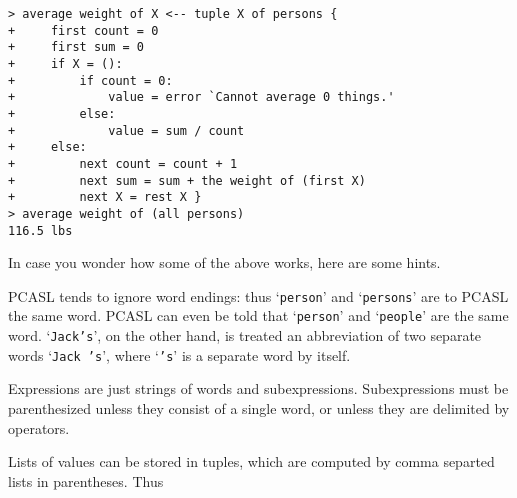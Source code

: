 \documentclass[12pt]{article}
\newenvironment{indpar}[1][0.3in]%
	{\begin{list}{}%
		     {\setlength{\itemsep}{0in}%
		      \setlength{\topsep}{0in}%
		      \setlength{\parsep}{1ex}%
		      \setlength{\labelwidth}{#1}%
		      \setlength{\leftmargin}{#1}%
		      \addtolength{\leftmargin}{\labelsep}}%
	 \item}%
	{\end{list}}
\begin{document}
\begin{indpar}
\verb|> average weight of X <-- tuple X of persons {| \\
\verb|+     first count = 0| \\
\verb|+     first sum = 0| \\
\verb|+     if X = ():| \\
\verb|+         if count = 0:| \\
\verb|+             value = error `Cannot average 0 things.'| \\
\verb|+         else:| \\
\verb|+             value = sum / count| \\
\verb|+     else:| \\
\verb|+         next count = count + 1| \\
\verb|+         next sum = sum + the weight of (first X)| \\
\verb|+         next X = rest X }| \\
\verb|> average weight of (all persons)| \\
\verb|116.5 lbs|
\end{indpar}

In case you wonder how some of the above works, here are some hints.

PCASL tends to ignore word endings: thus `{\tt person}' and
`{\tt persons}' are to PCASL the same word.
PCASL can even be told that `{\tt person}'
and `{\tt people}' are the same word.
`{\tt Jack's}', on the other hand, is treated an abbreviation
of two separate words `{\tt Jack 's}', where `{\tt 's}' is
a separate word by itself.

Expressions are just strings of words and subexpressions.  Subexpressions
must be parenthesized unless they consist of a single word, or unless
they are delimited by operators.

Lists of values can be stored in tuples, which are computed by comma
separted lists in parentheses.  Thus
\end{document}
